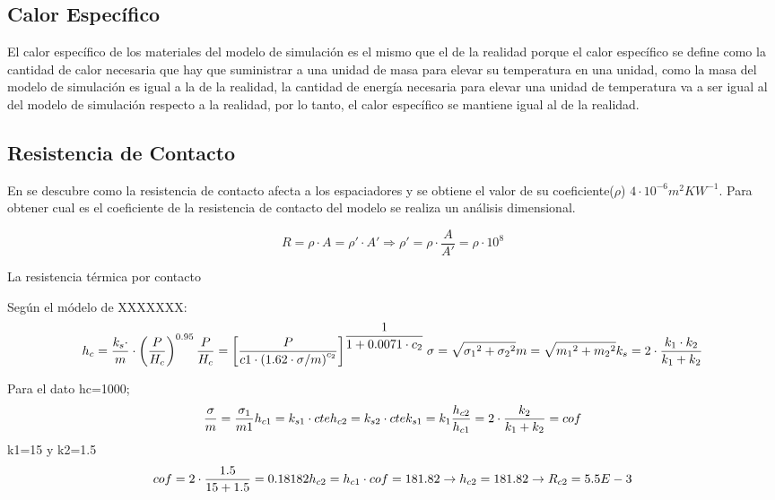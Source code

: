 \subsection{Calor Específico}
El calor específico de los materiales del modelo de simulación es el mismo que el de la realidad porque el calor específico se define como la cantidad de calor necesaria que hay que suministrar a una unidad de masa para elevar su temperatura en una unidad, como la masa del modelo de simulación es igual a la de la realidad, la cantidad de energía necesaria para elevar una unidad de temperatura va a ser igual al del modelo de simulación respecto a la realidad, por lo tanto, el calor específico se mantiene igual al de la realidad.
\subsection{Resistencia de Contacto}
En \cite{nf_TPV_Pillars_SiO2} se descubre como la resistencia de contacto afecta a los espaciadores y se obtiene el valor de su coeficiente($\rho$) $4\cdot 10^{-6}m^2 KW^{-1} $. Para obtener cual es el coeficiente de la resistencia de contacto del modelo se realiza un análisis dimensional.

\begin{equation}
	R= \rho \cdot A =\rho ' \cdot A' \Longrightarrow \rho '=\rho \cdot \dfrac{A}{A'}=\rho \cdot 10^8
\end{equation}

La resistencia térmica por contacto

Según el módelo de XXXXXXX:
\begin{equation}
	h_c=\dfrac{k_s\cdot}{m}\cdot \left( \dfrac{P}{H_c} \right)^{0.95} \\ \dfrac{P}{H_c} = \left[ \dfrac{P}{c1\cdot \left(1.62\cdot \sigma/m \right)^{c_2}}\right]^{\dfrac{1}{1+0.0071\cdot c_2}} \\	\sigma =\sqrt{{\sigma_1}^2+{\sigma_2}^2} \\ m=\sqrt{{m_1}^2+{m_2}^2}	\\ k_s=2\cdot \dfrac{k_1\cdot k_2}{k_1+k_2}
\end{equation}

Para el dato hc=1000;
\begin{equation}
	\dfrac{\sigma}{m}=\dfrac{\sigma_1}{m1}	\\ h_{c1}=k_{s1}\cdot cte \\ h_{c2}=k_{s2}\cdot cte	\\ k_{s1}=k_1 \\ \dfrac{h_{c2}}{h_{c1}}= 2\cdot \dfrac{k_2}{k_1+k_2}=cof
\end{equation}
k1=15 y k2=1.5
\begin{equation}
	cof=2\cdot \dfrac{1.5}{15+1.5}=0.18182
	\\ h_{c2}=h_{c1}\cdot cof=181.82 \rightarrow h_{c2}=181.82 \rightarrow R_{c2}=5.5E-3
\end{equation}

